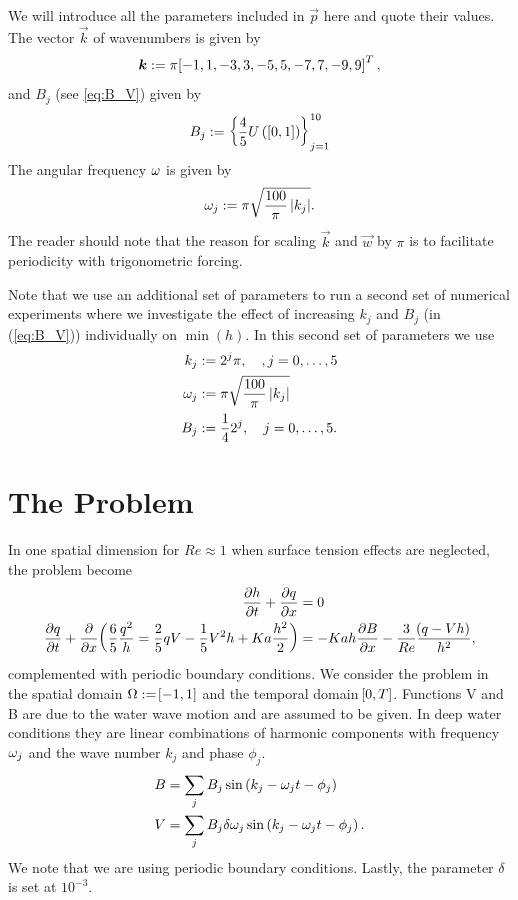 \documentclass{amsart}
\theoremstyle{definition}
\theoremstyle{remark}
\numberwithin{equation}{section}
\begin{document}
We will introduce all the parameters included in $\vec{p}$ here and quote their values. The  vector $\vec k$ of wavenumbers is given by
\begin{equation}
\boldsymbol{k}:=\pi\!\left[{-1,1,-3,3,-5,5,-7,7,-9,9}\right]^T,
\end{equation}
and $B_j$ (see \ref{eq:B_V}) given by 
\begin{equation}
B_j:= \left\lbrace\frac{4}{5}U\left([0,1]\right)\right\rbrace_{j=1}^{10}
\end{equation}
The angular frequency $\omega$ is given by 
\begin{equation}
\omega_j :=\pi \sqrt{\frac{100}{\pi}\left|k_j\right|}.
\end{equation}
The reader should note that the reason for scaling $\vec{k}$ and $\vec{w}$ by $\pi$ is to  facilitate  periodicity with trigonometric forcing.
\begin{Rem} Note that we use an additional  set of parameters to run a second set of numerical experiments where we investigate the effect of increasing $k_j$ and $B_j$ (in (\ref{eq:B_V})) individually on $\min(h)$.  In this second set of parameters we use
	\begin{equation}\label{eq:second_parameter_set}
\begin{aligned}
{k}_j&:=2^j\pi,\quad, j=0,\dots,5\\
\omega_j &:=\pi \sqrt{\frac{100}{\pi}\left|k_j\right|}\\
B_j&:=\frac{1}{4}2^j,\quad j = 0,\dots,5.
\end{aligned}
	\end{equation}
\end{Rem}

\section{The Problem}
In one spatial dimension for $Re\approx 1$ when surface tension effects are neglected, the problem become
\begin{equation}
\begin{aligned}
\frac{\partial h}{\partial t} + \frac{\partial q}{\partial x}&=0\\
\frac{\partial q}{\partial t} + \frac{\partial }{\partial x}\!\left({\frac{6}{5}\frac{q^2}{h}=\frac{2}{5}qV-\frac{1}{5}V^2h+Ka\frac{h^2}{2}}\right)&=-Kah\frac{\partial B}{\partial x}-\frac{3}{Re}\frac{\!\left({q-Vh}\right)}{h^2},
\end{aligned}
\end{equation}
 complemented with periodic boundary conditions. We consider the problem in the spatial domain $\Omega:=\!\left[{-1,1}\right]$ and the temporal domain $\!\left[{0,T}\right]$. Functions V and B are due to the water wave motion and are assumed to be given.  In deep water conditions they are linear combinations of harmonic components with frequency $\omega_j$ and the wave number $k_j$ and phase $\phi_j$.
 \begin{equation}\label{eq:B_V}
\begin{aligned}
B&=\sum_jB_j\operatorname{sin}\left(k_j-\omega_jt-\phi_j\right)\\
V&=\sum_jB_j\delta\omega_j\operatorname{sin}\left(k_j-\omega_jt-\phi_j\right).
\end{aligned}
 \end{equation}
We note that we are using periodic boundary conditions.  Lastly, the parameter $\delta$ is set at $10^{-3}$.
\end{document}
